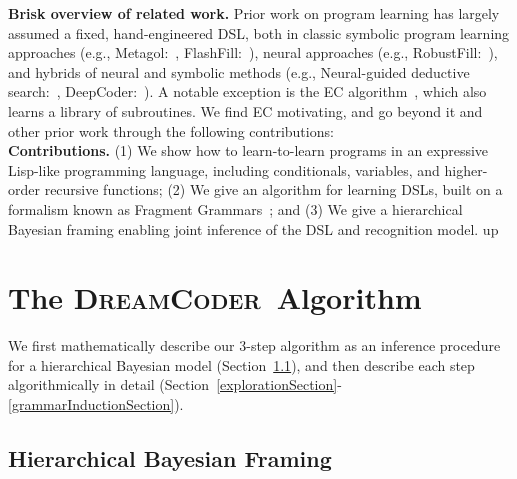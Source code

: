 \documentclass{article}
\newcommand{\system}{\textsc{DreamCoder}~}
\begin{document}
\textbf{Brisk overview of related work.} Prior work on program learning has largely assumed a fixed, hand-engineered DSL,
both in classic symbolic program learning approaches (e.g., Metagol:~\cite{muggleton2015meta},
FlashFill:~\cite{gulwani2011automating}),
neural approaches  (e.g., RobustFill:~\cite{devlin2017robustfill}), and hybrids of neural and
symbolic methods (e.g., Neural-guided deductive search:~\cite{ngds}, DeepCoder:~\cite{balog2016deepcoder}).
A notable exception is the EC algorithm~\cite{Dechter:2013:BLV:2540128.2540316},
which also learns a library of subroutines.
We find EC motivating, and go beyond it and other prior work through the following contributions: %
\\\textbf{Contributions.} (1) We show how to learn-to-learn programs in an expressive Lisp-like programming language, including conditionals, variables, and higher-order recursive functions;
(2) We give an algorithm for learning DSLs,
built on a formalism known as Fragment Grammars~\cite{tim};
and (3) We give a hierarchical Bayesian framing enabling joint inference of the DSL and recognition model.
up

\section{The \system Algorithm}

 We first mathematically describe our 3-step algorithm as
 an inference procedure for a hierarchical Bayesian model (Section~\ref{mathematicalFraming}),
  and then describe each step algorithmically in detail (Section~\ref{explorationSection}-\ref{grammarInductionSection}).

 \subsection{Hierarchical Bayesian Framing}\label{mathematicalFraming}
\end{document}
